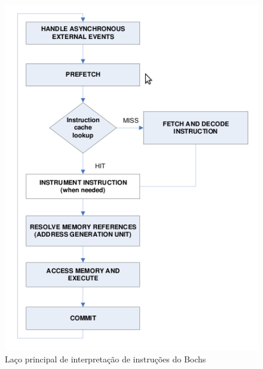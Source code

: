 \documentclass[11pt,twoside]{article}
\begin{document}
\begin{figure}[!h]
  	\begin{center}
    	\includegraphics[scale=0.5]{figures/bochs_loop.png}
	\end{center}
	\caption{Laço principal de interpretação de instruções do Bochs}
	\label{fig:bochs_loop}
\end{figure}
\end{document}
